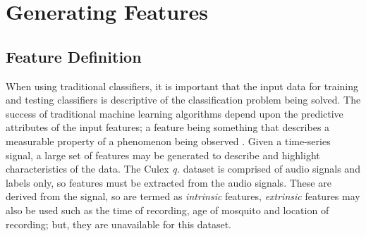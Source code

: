 \section{Generating Features}
\label{sec:pl-feats}
    \subsection{Feature Definition}
    \label{subsec:pl-feats-def}
        When using traditional classifiers, it is important that the input data for training and testing classifiers is descriptive of the classification problem being solved. The success of traditional machine learning algorithms depend upon the predictive attributes of the input features; a feature being something that describes a measurable property of a phenomenon being observed \cite{Bishop2006}. Given a time-series signal, a large set of features may be generated to describe and highlight characteristics of the data. The Culex \textit{q.} dataset is comprised of audio signals and labels only, so features must be extracted from the audio signals. These are derived from the signal, so are termed as \textit{intrinsic} features, \textit{extrinsic} features may also be used such as the time of recording, age of mosquito and location of recording; but, they are unavailable for this dataset.
        
